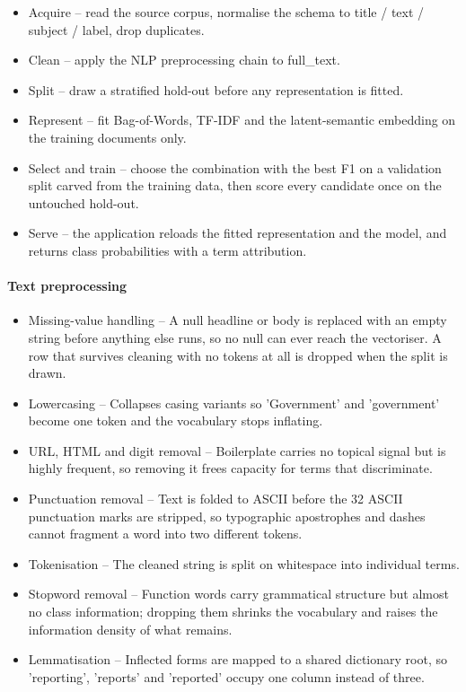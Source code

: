 \documentclass[conference,a4paper]{IEEEtran}
\begin{document}
\begin{itemize}
  \item Acquire -- read the source corpus, normalise the schema to title / text / subject / label, drop duplicates.
  \item Clean -- apply the NLP preprocessing chain to full\_text.
  \item Split -- draw a stratified hold-out before any representation is fitted.
  \item Represent -- fit Bag-of-Words, TF-IDF and the latent-semantic embedding on the training documents only.
  \item Select and train -- choose the combination with the best F1 on a validation split carved from the training data, then score every candidate once on the untouched hold-out.
  \item Serve -- the application reloads the fitted representation and the model, and returns class probabilities with a term attribution.
\end{itemize}

\paragraph{Text preprocessing}

\begin{itemize}
  \item Missing-value handling -- A null headline or body is replaced with an empty string before anything else runs, so no null can ever reach the vectoriser. A row that survives cleaning with no tokens at all is dropped when the split is drawn.
  \item Lowercasing -- Collapses casing variants so 'Government' and 'government' become one token and the vocabulary stops inflating.
  \item URL, HTML and digit removal -- Boilerplate carries no topical signal but is highly frequent, so removing it frees capacity for terms that discriminate.
  \item Punctuation removal -- Text is folded to ASCII before the 32 ASCII punctuation marks are stripped, so typographic apostrophes and dashes cannot fragment a word into two different tokens.
  \item Tokenisation -- The cleaned string is split on whitespace into individual terms.
  \item Stopword removal -- Function words carry grammatical structure but almost no class information; dropping them shrinks the vocabulary and raises the information density of what remains.
  \item Lemmatisation -- Inflected forms are mapped to a shared dictionary root, so 'reporting', 'reports' and 'reported' occupy one column instead of three.
\end{itemize}
\end{document}
